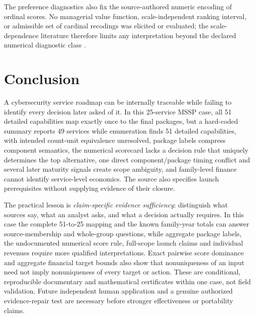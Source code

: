 \documentclass[systems,article,submit,moreauthors]{Definitions/mdpi}
\begin{document}
The preference diagnostics also fix the source-authored numeric encoding of ordinal scores. No managerial value function, scale-independent ranking interval, or admissible set of cardinal recodings was elicited or evaluated; the scale-dependence literature therefore limits any interpretation beyond the declared numerical diagnostic class \cite{PunkkaSalo2014}.

\section{Conclusion}
A cybersecurity service roadmap can be internally traceable while failing to identify every decision later asked of it. In this 25-service MSSP case, all 51 detailed capabilities map exactly once to the final packages, but a hard-coded summary reports 49 services while enumeration finds 51 detailed capabilities, with intended count-unit equivalence unresolved, package labels compress component semantics, the numerical scorecard lacks a decision rule that uniquely determines the top alternative, one direct component/package timing conflict and several later maturity signals create scope ambiguity, and family-level finance cannot identify service-level economics. The source also specifies launch prerequisites without supplying evidence of their closure.

The practical lesson is \emph{claim-specific evidence sufficiency}: distinguish what sources say, what an analyst asks, and what a decision actually requires. In this case the complete 51-to-25 mapping and the known family-year totals can answer source-membership and whole-group questions, while aggregate package labels, the undocumented numerical score rule, full-scope launch claims and individual revenues require more qualified interpretations. Exact pairwise score dominance and aggregate financial target bounds also show that nonuniqueness of an input need not imply nonuniqueness of every target or action. These are conditional, reproducible documentary and mathematical certificates within one case, not field validation. Future independent human application and a genuine authorized evidence-repair test are necessary before stronger effectiveness or portability claims.
\end{document}
